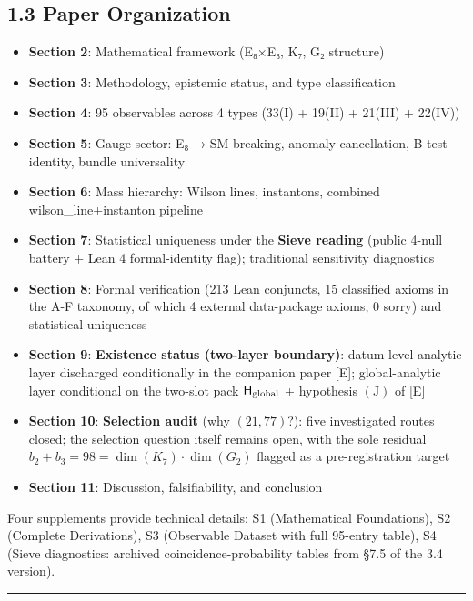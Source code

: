 \documentclass[11pt,a4paper]{article}
\begin{document}
\subsection{1.3 Paper Organization}\label{paper-organization}

\begin{itemize}
\tightlist
\item
  \textbf{Section 2}: Mathematical framework (E₈×E₈, K₇, G₂ structure)
\item
  \textbf{Section 3}: Methodology, epistemic status, and type classification
\item
  \textbf{Section 4}: 95 observables across 4 types (33(I) + 19(II) + 21(III) + 22(IV))
\item
  \textbf{Section 5}: Gauge sector: E₈ → SM breaking, anomaly cancellation, B-test identity, bundle universality
\item
  \textbf{Section 6}: Mass hierarchy: Wilson lines, instantons, combined wilson\_\allowbreak{}line+instanton pipeline
\item
  \textbf{Section 7}: Statistical uniqueness under the \textbf{Sieve reading} (public 4-null battery + Lean 4 formal-identity flag); traditional sensitivity diagnostics
\item
  \textbf{Section 8}: Formal verification (213 Lean conjuncts, 15 classified axioms in the A-F taxonomy, of which 4 external data-package axioms, 0 sorry) and statistical uniqueness
\item
  \textbf{Section 9}: \textbf{Existence status (two-layer boundary)}: datum-level analytic layer discharged conditionally in the companion paper {[}E{]}; global-analytic layer conditional on the two-slot pack \(\mathsf H_{\rm global}\) + hypothesis \((\mathrm J)\) of {[}E{]}
\item
  \textbf{Section 10}: \textbf{Selection audit} (why \((21, 77)\)?): five investigated routes closed; the selection question itself remains open, with the sole residual \(b_2 + b_3 = 98 = \dim(K_7) \cdot \dim(G_2)\) flagged as a pre-registration target
\item
  \textbf{Section 11}: Discussion, falsifiability, and conclusion
\end{itemize}

Four supplements provide technical details: S1 (Mathematical Foundations), S2 (Complete Derivations), S3 (Observable Dataset with full 95-entry table), S4 (Sieve diagnostics: archived coincidence-probability tables from §7.5 of the 3.4 version).

\begin{center}\rule{\linewidth}{0.5pt}\end{center}
\end{document}
